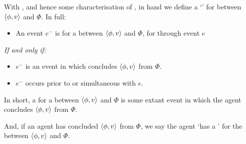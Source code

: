 \begin{note}
  With \supportI{}, and hence some characterisation of \ros{}, in hand we define a `' for \ros{} between \(\langle \phi, v \rangle\) and \(\Phi\).
  In full:

  \begin{definition}%
    \label{def:witnessing}%
    \vspace{-\baselineskip}
    \begin{itemize}
    \item
      An event \(e^{-}\) is \emph{} for a \ros{} between \(\langle \phi, v \rangle\) and \(\Phi\), for \vAgent{} through event \(e\)
    \end{itemize}

    \emph{If and only if:}

    \begin{itemize}
    \item
      \(e^{-}\) is an event in which \vAgent{} concludes \(\langle \phi, v \rangle\) from \(\Phi\).
    \item
      \(e^{-}\) occurs prior to or simultaneous with \(e\).
    \end{itemize}
    \vspace{-\baselineskip}
  \end{definition}

  \noindent%
  In short, a \wit{} for a \ros{} between \(\langle \phi, v \rangle\) and \(\Phi\) is some extant event in which the agent concludes \(\langle \phi, v \rangle\) from \(\Phi\).

  And, if an agent has concluded \(\langle \phi, v \rangle\) from \(\Phi\), we say the agent `has a \wit{}' for the \ros{} between \(\langle \phi, v \rangle\) and \(\Phi\).
\end{note}

